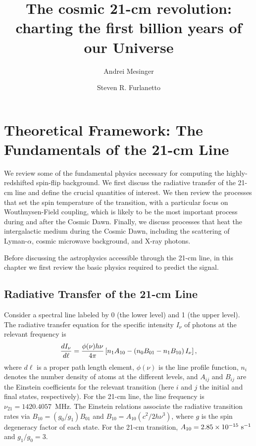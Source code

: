 \documentclass[a4paper,openany, 12pt]{book}
\title{The cosmic 21-cm revolution: charting the first billion years of our Universe}
\author{Andrei Mesinger}
\begin{document}
\chapter{Theoretical Framework: The Fundamentals of the 21-cm Line}

\begin{bf}
  \author{Steven R. Furlanetto}
  
We review some of the fundamental physics necessary for computing the highly-redshifted spin-flip background. We first discuss the radiative transfer of the 21-cm line and define the crucial quantities of interest. We then review the processes that set the spin temperature of the transition, with a particular focus on Wouthuysen-Field coupling, which is likely to be the most important process during and after the Cosmic Dawn. Finally, we discuss processes that heat the intergalactic medium during the Cosmic Dawn, including the scattering of Lyman-$\alpha$, cosmic microwave background, and X-ray photons.  \\
\end{bf}

Before discussing the astrophysics accessible through the 21-cm line, in this chapter we first review the basic physics required to predict the signal. 

\section{Radiative Transfer of the 21-cm Line} \label{rt-21cm}

Consider a spectral line labeled by 0 (the lower level) and 1 (the upper level). The radiative transfer equation for the specific intensity $I_\nu$ of photons at the relevant frequency is
\begin{equation}
{dI_\nu\over d\ell}={\phi(\nu) h\nu\over 4\pi}\left[n_1 A_{10} -
\left(n_0 B_{01} -n_1 B_{10}\right)I_\nu\right],
\label{rad}
\end{equation}
where $d\ell$ is a proper path length element, $\phi(\nu)$ is the line profile function, $n_i$
denotes the number density of atoms at the different levels, and $A_{ij}$ and $B_{ij}$ are the Einstein coefficients for the relevant transition (here $i$ and $j$ the initial and final states, respectively). For the 21-cm line, the line frequency is $\nu_{21} = 1420.4057$~MHz. The Einstein relations associate the radiative transition rates via $B_{10}=(g_0/g_1)B_{01}$ and $B_{10}=A_{10}(c^2/2 h\nu^3)$, where $g$ is the spin degeneracy factor of each state. For the 21-cm transition, $A_{10}=2.85\times 10^{-15} \ {\rm s^{-1}}$ and $g_1/g_0=3$.
\end{document}
